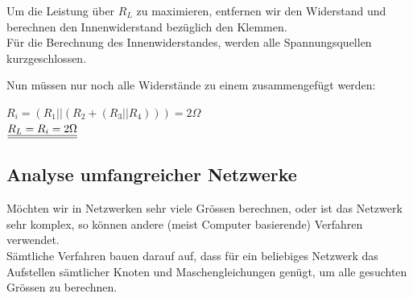 \beginbsp
Um die Leistung über $R_L$ zu maximieren, entfernen wir den Widerstand und berechnen den Innenwiderstand bezüglich den Klemmen. \\
Für die Berechnung des Innenwiderstandes, werden alle Spannungsquellen kurzgeschlossen.
\begin{center}
\end{center}
Nun müssen nur noch alle Widerstände zu einem zusammengefügt werden:
\begin{center}
	$R_i = (R_1 || (R_2 + (R_3 || R_4 ) )) = 2 \Omega$ \\
	$\underline{\underline{ R_L = R_i = 2 \Omega}}$
\end{center}
\iend










\newpage





\subsection{Analyse umfangreicher Netzwerke}

Möchten wir in Netzwerken sehr viele Grössen berechnen, oder ist das Netzwerk sehr komplex, so können andere (meist Computer basierende) Verfahren verwendet. \\
Sämtliche Verfahren bauen darauf auf, dass für ein beliebiges Netzwerk das Aufstellen sämtlicher Knoten und Maschengleichungen genügt, um alle gesuchten Grössen zu berechnen. \\

